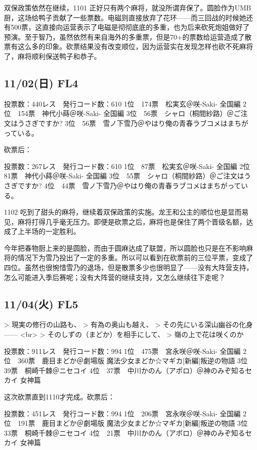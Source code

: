 双保政策依然在继续，1101 正好只有两个麻将，就没所谓弃保了。圆脸作为UMB厨，这场给鸭子贡献了一些票数。电磁则直接放弃了花环——而三回战的时候她还有500票，这直接向运营表示了电磁是彻彻底底的多重，也为后来砍死炮姐做好了预演。至于智乃，虽然依然有来自海外的多重票，但是70+的票数给运营造成了散票有这么多的印象。砍票结果没有改变顺位，因为运营实在发现怎样也砍不死麻将了，麻将顺利保送鸭子和恭子。

\subsection{11/02(日) FL4}

	投票数：440レス　発行コード数：610
	1位　174票　松実玄＠咲-Saki- 全国編
	2位　154票　神代小蒔＠咲-Saki- 全国編
	3位　56票　シャロ（桐間紗路）＠ご注文はうさぎですか?
	3位　56票　雪ノ下雪乃＠やはり俺の青春ラブコメはまちがっている。

砍票后：

	投票数：267レス　発行コード数：610
	1位　87票　松実玄＠咲-Saki- 全国編
	2位　81票　神代小蒔＠咲-Saki- 全国編
	3位　55票　シャロ（桐間紗路）＠ご注文はうさぎですか?
	4位　44票　雪ノ下雪乃＠やはり俺の青春ラブコメはまちがっている。

1102 吃到了甜头的麻将，继续着双保政策的实施。龙王和公主的顺位也是显而易见，麻将打得几乎毫无压力。即便是砍票之后，麻将也是保住了两个晋级名额，达成了上半场的一定胜利。

今年把春物厨上来的是圆脸，而由于圆麻达成了联盟，所以圆脸也只是在不影响麻将的情况下为雪乃投出了一定的多重。所以可以看到在砍票前的三位平票，变成了四位。虽然也很惋惜雪乃的退场，但是散票多少也很明显了——没有大阵营支持，怎么可能进入季后赛呢；没有大阵营的继续支持，又怎么继续往下走呢？

\subsection{11/04(火) FL5}

> 現実の修行の山路も、
> 有為の奥山も越え、
> その先にいる深山幽谷の化身—— <br>
> そのしずの（まどか）を相手にして、
> 嶺の上で花は咲くのか

	投票数：911レス　発行コード数：994
	1位　475票　宮永咲＠咲-Saki- 全国編
	2位　360票　鹿目まどか＠劇場版 魔法少女まどか☆マギカ[新編]叛逆の物語
	3位　39票　桐崎千棘＠ニセコイ
	4位　37票　中川かのん（アポロ）＠神のみぞ知るセカイ 女神篇

这次砍票直到1110才完成。砍票后：

	投票数：451レス　発行コード数：994
	1位　206票　宮永咲＠咲-Saki- 全国編
	2位　191票　鹿目まどか＠劇場版 魔法少女まどか☆マギカ[新編]叛逆の物語
	3位　33票　桐崎千棘＠ニセコイ
	4位　21票　中川かのん（アポロ）＠神のみぞ知るセカイ 女神篇

